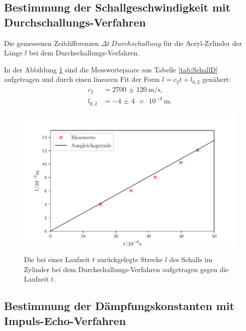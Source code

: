 \subsection{Bestimmung der Schallgeschwindigkeit mit Durchschallungs-Verfahren}

\begin{table}
	\centering
	\caption{Die gemessenen Zeitdifferenzen $\Delta t_.{Durchschallung}$ für die Acryl-Zylinder der Länge $l$ bei dem Durchschallungs-Verfahren.}
	
	\label{tab:SchallD}
\end{table}

\noindent In der Abbildung \ref{fig:SchallD} sind die Messwertepaare aus Tabelle \ref{tab:SchallD} aufgetragen und durch einen linearen Fit der Form $l=c_2 t + l_{0,2}$ genähert:
\begin{align*}
	c_2&=\SI{2700(120)}{\meter\per\second}\text{,}\\
	l_{0,2}&=\SI{-4(4)e-3}{\meter}\text{.}
\end{align*}

\begin{figure}
	\centering
	\caption{Die bei einer Laufzeit $t$ zurückgelegte Strecke $l$ des Schalls im Zylinder bei dem Durchschallungs-Verfahren aufgetragen gegen die Laufzeit $t$.}
	\includegraphics[width=\linewidth-70pt,height=\textheight-70pt,keepaspectratio]{content/images/SchallgeschwindigkeitDurchschallung.pdf}
	\label{fig:SchallD}
\end{figure}

\subsection{Bestimmung der Dämpfungskonstanten mit Impuls-Echo-Verfahren}

